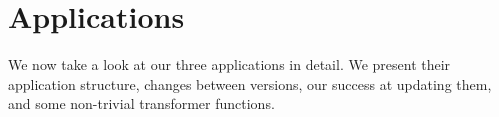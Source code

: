 
\section{Applications}

We now take a look at our three applications in detail. We present their
application structure, changes between versions, our success at updating
them, and some non-trivial transformer functions.
